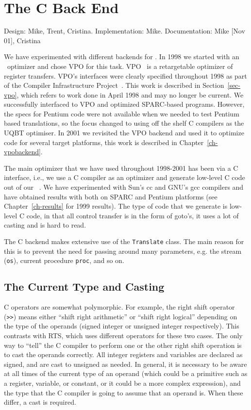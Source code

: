 
\chapter{The C Back End}
\label{ch-cbackend}

{\small
\begin{flushright}
Design: Mike, Trent, Cristina. Implementation: Mike. 
Documentation: Mike [Nov 01], Cristina
\end{flushright}
}

We have experimented with different backends for \uqbt.  
In 1998 we started with an \rtl\ optimizer and chose VPO for 
this task.  VPO~\cite{Beni88} is a retargetable optimizer
of register transfers.  VPO's interfaces were clearly 
specified throughout 1998 as part of the Compiler 
Infrastructure Project~\cite{Vpo98}. This work is described 
in Section~\ref{sec-vpo}, which refers to work done in 
April 1998 and may no longer be current.  
We successfully interfaced to VPO and optimized 
SPARC-based programs.  However, the specs for Pentium
code were not available when we needed to test Pentium
based translations, so the focus changed to using off the shelf C
compilers as the UQBT optimiser. 
In 2001 we revisited the VPO backend and used it to optimize 
code for several target platforms, this work is described in 
Chapter~\ref{ch-vpobackend}.

The main optimizer that we have used throughout 1998-2001 has 
been via a C interface, i.e., we use a C compiler as an optimizer 
and generate low-level C code out of our \hrtl\ .
We have experimented with Sun's cc and GNU's gcc compilers 
and have obtained results with both on SPARC and Pentium 
platforms (see Chapter~\ref{ch-results} for 1999 results).  
The type of code that we generate is low-level 
C code, in that all control transfer is in the form of goto's,
it uses a lot of casting and is hard to read.  

The C backend makes extensive use of the \texttt{Translate} class. The main
reason for this is to prevent the need for passing around many parameters,
e.g. the stream (\texttt{os}), current procedure \texttt{proc}, and so on.


\section{The Current Type and Casting}

C operators are somewhat polymorphic. For example, the right shift operator
(\texttt{>>}) means either ``shift right arithmetic'' or ``shift right logical''
depending on the type of the operands (signed integer or unsigned integer
respectively). This contrasts with RTS, which uses different operators for
these two cases. The only way to ``tell'' the C compiler to perform one or the
other right shift operation is to cast the operands correctly. All integer
registers and variables are declared as signed, and are cast to unsigned as
needed. In general, it is necessary to be aware at all times of the
current type of an operand (which could be a primitive such as a register,
variable, or constant, or it could be a more complex expression), and
the type that the C compiler is going to assume that an operand is.
When these differ, a cast is required.

